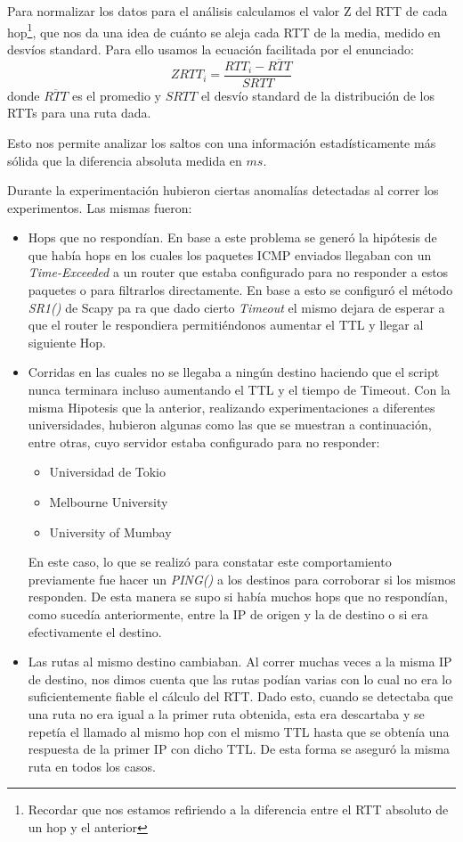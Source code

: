 Para normalizar los datos para el análisis calculamos el valor Z del RTT de cada hop\footnote{Recordar que nos estamos refiriendo a la diferencia entre el RTT absoluto de un hop y el anterior}, que nos da una idea de cuánto se aleja cada RTT de la media, medido en desvíos standard. Para ello usamos la ecuación facilitada por el enunciado: $$ ZRTT_i = \dfrac{RTT_i-\overline{RTT}}{SRTT}$$ donde $\overline{RTT}$ es el promedio y $SRTT$ el desvío standard de la distribución de los RTTs para una ruta dada.

Esto nos permite analizar los saltos con una información estadísticamente más sólida que la diferencia absoluta medida en $ms$.

Durante la experimentación hubieron ciertas anomalías detectadas al correr los experimentos. Las mismas fueron:

\begin{itemize}
    \item Hops que no respondían. En base a este problema se generó la hipótesis de que había hops en los cuales los paquetes ICMP enviados llegaban con un \textit{Time-Exceeded} a un router que estaba configurado para no responder a estos paquetes o para filtrarlos directamente. En base a esto se configuró el método \textit{SR1()} de Scapy pa ra que dado cierto \textit{Timeout} el mismo dejara de esperar a que el router le respondiera permitiéndonos aumentar el TTL y llegar al siguiente Hop.
    \item Corridas en las cuales no se llegaba a ningún destino haciendo que el script nunca terminara incluso aumentando el TTL y el tiempo de Timeout. Con la misma Hipotesis que la anterior, realizando experimentaciones a diferentes universidades, hubieron algunas como las que se muestran a continuación, entre otras, cuyo servidor estaba configurado para no responder:
    \begin{itemize}
        \item Universidad de Tokio
        \item Melbourne University
        \item University of Mumbay
    \end{itemize}
    En este caso, lo que se realizó para constatar este comportamiento previamente fue hacer un \textit{PING()} a los destinos para corroborar si los mismos responden. De esta manera se supo si había muchos hops que no respondían, como sucedía anteriormente, entre la IP de origen y la de destino o si era efectivamente el destino.
    \item Las rutas al mismo destino cambiaban. Al correr muchas veces a la misma IP de destino, nos dimos cuenta que las rutas podían varias con lo cual no era lo suficientemente fiable el cálculo del RTT. Dado esto, cuando se detectaba que una ruta no era igual a la primer ruta obtenida, esta era descartaba y se repetía el llamado al mismo hop con el mismo TTL hasta que se obtenía una respuesta de la primer IP con dicho TTL. De esta forma se aseguró la misma ruta en todos los casos.
\end{itemize}

